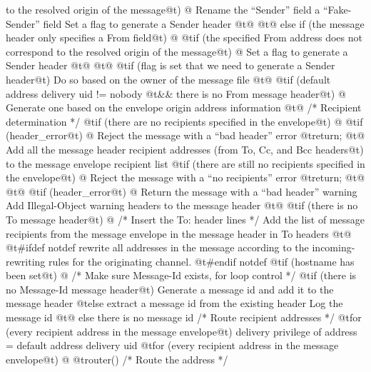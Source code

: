 {{{{{                to the resolved origin of the message@t{) @{}
                Rename the ``Sender'' field a ``Fake-Sender'' field
                Set a flag to generate a Sender header
            @t{@}}
        @t{@} else if (}the message header only specifies a From field@t{) @{}
            @t{if (}the specified From address does not correspond
                to the resolved origin of the message@t{) @{}
                Set a flag to generate a Sender header
            @t{@}}
        @t{@}}
        @t{if (}flag is set that we need to generate a Sender header@t{)}
            Do so based on the owner of the message file
    @t{@}}
    @t{if (}default address delivery uid != nobody
        @t{&&} there is no From message header@t{) @{}
        Generate one based on the envelope origin address information
    @t{@}}
    /* Recipient determination */
    @t{if (}there are no recipients specified in the envelope@t{) @{}
        @t{if (}header_error@t{) @{}
            Reject the message with a ``bad header'' error
            @t{return;}
        @t{@}}
        Add all the message header recipient addresses (from To, Cc,
            and Bcc headers@t{)} to the message envelope recipient list
        @t{if (}there are still no recipients specified in the envelope@t{) @{}
            Reject the message with a ``no recipients'' error
            @t{return;}
        @t{@}}
    @t{@}}
    @t{if (}header_error@t{) @{}
        Return the message with a ``bad header'' warning
        Add Illegal-Object warning headers to the message header
    @t{@}}
    @t{if (}there is no To message header@t{) @{}
        /* Insert the To: header lines */
        Add the list of message recipients from the message envelope
            in the message header in To headers
    @t{@}}
@t{#ifdef notdef}
    rewrite all addresses in the message according to the incoming-rewriting
        rules for the originating channel.
@t{#endif notdef}
    @t{if (}hostname has been set@t{) @{}
        /* Make sure Message-Id exists, for loop control */
        @t{if (}there is no Message-Id message header@t{)}
            Generate a message id and add it to the message header
        @t{else}
            extract a message id from the existing header
        Log the message id
    @t{@} else}
        there is no message id
    /* Route recipient addresses */
    @t{for (}every recipient address in the message envelope@t{)}
        delivery privilege of address = default address delivery uid
    @t{for (}every recipient address in the message envelope@t{) @{}
        @t{router()}    /* Route the address */
}}}}
